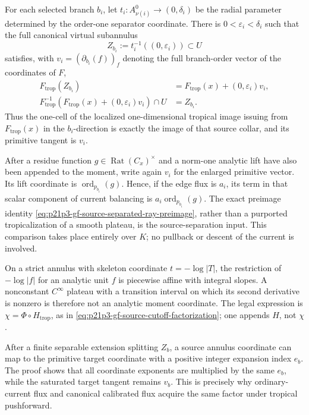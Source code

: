 \begin{proposition}
\begin{enumerate}
For each selected branch \(b_i\), let
\(t_i:A_{\nu(i)}^0\to(0,\delta_i)\) be the radial parameter determined by
the order-one separator coordinate.  There is
\(0<\varepsilon_i<\delta_i\) such that the full canonical virtual subannulus
\[
 Z_{b_i}:=t_i^{-1}((0,\varepsilon_i))\subset U
\]
satisfies, with \(v_i=(\partial_{b_i}(f))_f\) denoting the full branch-order
vector of the coordinates of \(F\),
\begin{align}
 F_{\mathrm{trop}}(Z_{b_i})
   &=F_{\mathrm{trop}}(x)+(0,\varepsilon_i)v_i,
 \label{eq:p21p3-gf-source-separated-ray-image}\\
 F_{\mathrm{trop}}^{-1}\!\left(
   F_{\mathrm{trop}}(x)+(0,\varepsilon_i)v_i\right)\cap U
   &=Z_{b_i}.
 \label{eq:p21p3-gf-source-separated-ray-preimage}
\end{align}
Thus the one-cell of the localized one-dimensional tropical image issuing
from \(F_{\mathrm{trop}}(x)\) in the \(b_i\)-direction is exactly the image
of that source collar, and its primitive tangent is \(v_i\).

After a residue function \(g\in\operatorname{Rat}(C_x)^\times\) and a
norm-one analytic lift have also been appended to the moment, write again
\(v_i\) for the enlarged primitive vector.  Its lift coordinate is
\(\operatorname{ord}_{p_{b_i}}(g)\).  Hence, if
the edge flux is \(a_i\), its term in that scalar component of current
balancing is
\(a_i\operatorname{ord}_{p_{b_i}}(g)\).  The exact preimage identity
\eqref{eq:p21p3-gf-source-separated-ray-preimage}, rather than a purported
tropicalization of a smooth plateau, is the source-separation input.  This
comparison takes place entirely over \(K\); no pullback or descent of the
current is involved.
\end{enumerate}
\end{proposition}

\begin{remark}
\label{rem:p21p3-gf-no-plateau-coordinate}
On a strict annulus with skeleton coordinate \(t=-\log|T|\), the restriction
of \(-\log|f|\) for an analytic unit \(f\) is piecewise affine with integral
slopes.  A nonconstant \(C^\infty\) plateau with a transition interval on
which its second derivative is nonzero is therefore not an analytic moment
coordinate.  The legal expression is \(\chi=\Phi\circ H_{\mathrm{trop}}\),
as in \eqref{eq:p21p3-gf-source-cutoff-factorization}; one appends \(H\), not
\(\chi\).
\end{remark}

\begin{remark}
\label{rem:p21p3-gf-virtual-annulus-index}
After a finite separable extension splitting \(Z_b\), a source annulus
coordinate can map to the primitive target coordinate with a positive
integer expansion index \(e_b\).  The proof shows that all coordinate
exponents are multiplied by the same \(e_b\), while the saturated target
tangent remains \(v_b\).  This is precisely why ordinary-current flux and
canonical calibrated flux acquire the same factor under tropical
pushforward.
\end{remark}


